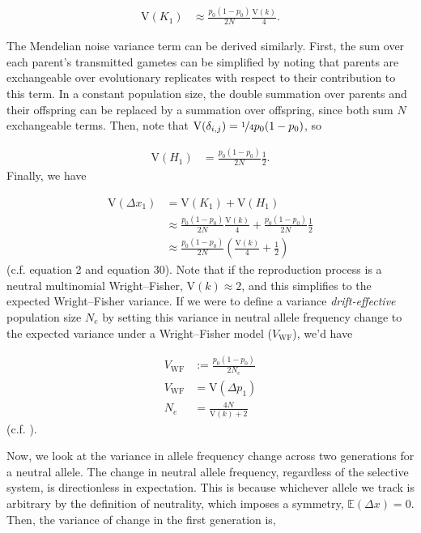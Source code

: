 \documentclass[11pt]{article}
\newcommand{\E}{\mathbb{E}}
\newcommand{\V}{\text{V}}
\begin{document}
\begin{align}
  \V(K_1) &\approx \frac{p_0(1-p_0)}{2N} \frac{\V(k)}{4}.
\end{align}

The Mendelian noise variance term can be derived similarly. First, the sum over
each parent's transmitted gametes can be simplified by noting that parents are
exchangeable over evolutionary replicates with respect to their contribution to
this term. In a constant population size, the double summation over parents and
their offspring can be replaced by a summation over offspring, since both sum
$N$ exchangeable terms. Then, note that $\V(\delta_{i,j}) = \nicefrac{1}{4}
p_0(1-p_0)$, so

\begin{align}
  \V(H_1) &= \frac{p_0(1-p_0)}{2N} \frac{1}{2}.
\end{align}
%
Finally, we have

\begin{align}
  \V(\Delta x_1) &= \V(K_1) + \V(H_1) \\
  &\approx \frac{p_0(1-p_0)}{2N} \frac{\V(k)}{4} + \frac{p_0(1-p_0)}{2N} \frac{1}{2} \nonumber \\
                   &\approx \frac{p_0(1-p_0)}{2N}\left(\frac{\V(k)}{4} + \frac{1}{2}\right)
\end{align}
%
(c.f. \cite{Santiago1995-hx} equation 2 and \cite{Buffalo2019-qs} equation 30).
Note that if the reproduction process is a neutral multinomial Wright--Fisher,
$\V(k) \approx 2$, and this simplifies to the expected Wright--Fisher
variance. If we were to define a variance \emph{drift-effective} population
size $N_e$ by setting this variance in neutral allele frequency change to the
expected variance under a Wright--Fisher model ($V_\text{WF}$), we'd have

\begin{align}
  V_\text{WF} &:= \frac{p_0(1-p_0)}{2N_e} \nonumber \\
  V_\text{WF} &= \V(\Delta p_1) \nonumber \\
  N_e &= \frac{4N}{\V(k) + 2} \label{supp-eq:var-ne}
\end{align}
%
(c.f. \cite{Wright1938-tv}). 

Now, we look at the variance in allele frequency change across two generations
for a neutral allele. The change in neutral allele frequency, regardless of the
selective system, is directionless in expectation. This is because whichever
allele we track is arbitrary by the definition of neutrality, which imposes a
symmetry, $\E(\Delta x) = 0$. Then, the variance of change in the first
generation is,
\end{document}
